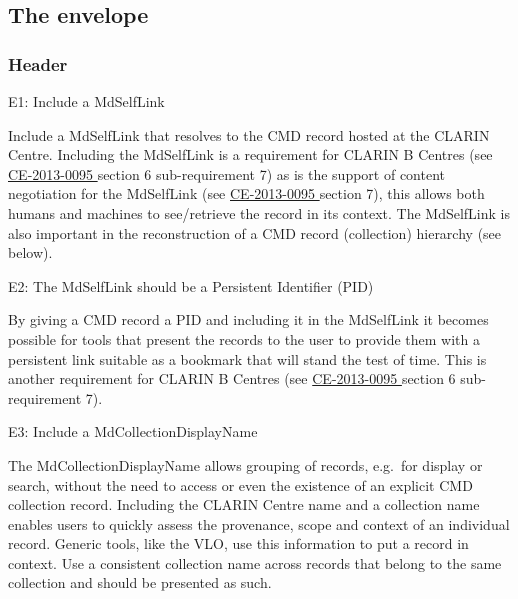 \subsection{The envelope}\label{the-envelope}

\subsubsection{Header}\label{header}

E1: Include a MdSelfLink


Include a MdSelfLink that resolves to the CMD record hosted at the CLARIN Centre. Including the MdSelfLink is a requirement for CLARIN B Centres (see
\href{http://hdl.handle.net/1839/00-DOCS.CLARIN.EU-78}{CE-2013-0095 \cite{ce20130095}} section 6 sub-requirement 7) as is the support of content negotiation for the MdSelfLink (see
\href{http://hdl.handle.net/1839/00-DOCS.CLARIN.EU-78}{CE-2013-0095 \cite{ce20130095}} section 7), this allows both humans and machines to see/retrieve the record in its context. The MdSelfLink is also important in the reconstruction of a CMD record (collection) hierarchy (see below).

\label{e2}
E2: The MdSelfLink should be a Persistent Identifier (PID)


By giving a CMD record a PID and including it in the MdSelfLink it becomes possible for tools that present the records to the user to provide them with a persistent link suitable as a bookmark that will stand the test of time. This is another requirement for CLARIN B Centres (see
\href{http://hdl.handle.net/1839/00-DOCS.CLARIN.EU-78}{CE-2013-0095 \cite{ce20130095}} section 6 sub-requirement 7).

E3: Include a MdCollectionDisplayName

 

The MdCollectionDisplayName allows grouping of records, e.g.~for display or search, without the need to access or even the existence of an explicit CMD collection record. Including the CLARIN Centre name and a collection name enables users to quickly assess the provenance, scope and context of an individual record. Generic tools, like the VLO, use this information to put a record in context. Use a consistent collection name across records that belong to the same collection and should be presented as such.

